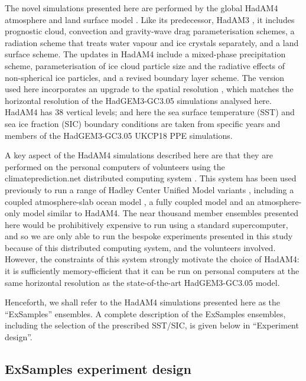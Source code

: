       The novel simulations presented here are performed by the global HadAM4 atmosphere and land surface model \citep{webb_combining_2001,williams_evaluating_2003}. Like its predecessor, HadAM3 \citep{pope_impact_2000}, it includes prognostic cloud, convection and gravity-wave drag parameterisation schemes, a radiation scheme that treats water vapour and ice crystals separately, and a land surface scheme. The updates in HadAM4 include a mixed-phase precipitation scheme, parameterisation of ice cloud particle size and the radiative effects of non-spherical ice particles, and a revised boundary layer scheme. The version used here incorporates an upgrade to the spatial resolution \citep{bevacqua_larger_2021,watson_multi-thousand_2020}, which matches the horizontal resolution of the HadGEM3-GC3.05 simulations analysed here. HadAM4 has 38 vertical levels; and here the sea surface temperature (SST) and sea ice fraction (SIC) boundary conditions are taken from specific years and members of the HadGEM3-GC3.05 UKCP18 PPE simulations.

      A key aspect of the HadAM4 simulations described here are that they are performed on the personal computers of volunteers using the climateprediction.net distributed computing system \citep{allen_-it-yourself_1999,anderson_boinc_2004,stainforth_distributed_2002}. This system has been used previously to run a range of Hadley Center Unified Model variants \citep{brown_unified_2012}, including a coupled atmosphere-slab ocean model \citep{stainforth_uncertainty_2005}, a fully coupled model \citep{frame_climatepredictionnet_2009} and an atmosphere-only model \citep{pall_anthropogenic_2011} similar to HadAM4. The near thousand member ensembles presented here would be prohibitively expensive to run using a standard supercomputer, and so we are only able to run the bespoke experiments presented in this study because of this distributed computing system, and the volunteers involved. However, the constraints of this system strongly motivate the choice of HadAM4: it is sufficiently memory-efficient that it can be run on personal computers at the same horizontal resolution as the state-of-the-art HadGEM3-GC3.05 model.

      Henceforth, we shall refer to the HadAM4 simulations presented here as the ``ExSamples'' ensembles. A complete description of the ExSamples ensembles, including the selection of the prescribed SST/SIC, is given below in ``Experiment design''.
  
  \subsection{ExSamples experiment design}

